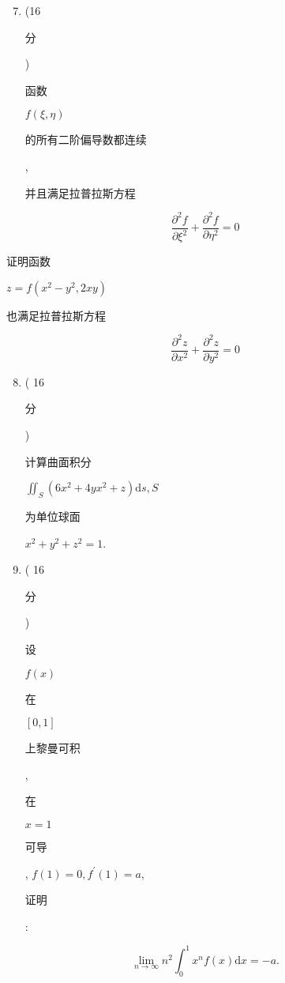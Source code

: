 \documentclass[10pt]{article}
\begin{document}
\begin{enumerate}
  \setcounter{enumi}{6}
  \item (16 \begin{CJK}{UTF8}{mj}分\end{CJK}) \begin{CJK}{UTF8}{mj}函数\end{CJK} $f(\xi, \eta)$ \begin{CJK}{UTF8}{mj}的所有二阶偏导数都连续\end{CJK}, \begin{CJK}{UTF8}{mj}并且满足拉普拉斯方程\end{CJK}
\end{enumerate}
$$
\frac{\partial^{2} f}{\partial \xi^{2}}+\frac{\partial^{2} f}{\partial \eta^{2}}=0
$$
\begin{CJK}{UTF8}{mj}证明函数\end{CJK} $z=f\left(x^{2}-y^{2}, 2 x y\right)$ \begin{CJK}{UTF8}{mj}也满足拉普拉斯方程\end{CJK}
$$
\frac{\partial^{2} z}{\partial x^{2}}+\frac{\partial^{2} z}{\partial y^{2}}=0
$$

\begin{enumerate}
  \setcounter{enumi}{7}
  \item ( 16 \begin{CJK}{UTF8}{mj}分\end{CJK}) \begin{CJK}{UTF8}{mj}计算曲面积分\end{CJK} $\iint_{S}\left(6 x^{2}+4 y x^{2}+z\right) \mathrm{d} s, S$ \begin{CJK}{UTF8}{mj}为单位球面\end{CJK} $x^{2}+y^{2}+z^{2}=1$.

  \item ( 16 \begin{CJK}{UTF8}{mj}分\end{CJK}) \begin{CJK}{UTF8}{mj}设\end{CJK} $f(x)$ \begin{CJK}{UTF8}{mj}在\end{CJK} $[0,1]$ \begin{CJK}{UTF8}{mj}上黎曼可积\end{CJK}, \begin{CJK}{UTF8}{mj}在\end{CJK} $x=1$ \begin{CJK}{UTF8}{mj}可导\end{CJK}, $f(1)=0, f^{\prime}(1)=a$, \begin{CJK}{UTF8}{mj}证明\end{CJK}:

\end{enumerate}
$$
\lim _{n \rightarrow \infty} n^{2} \int_{0}^{1} x^{n} f(x) \mathrm{d} x=-a .
$$
\end{document}
